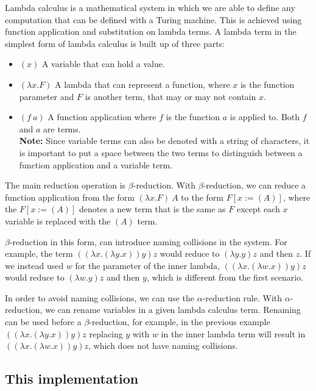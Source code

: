 \documentclass[12pt]{article}
\begin{document}
Lambda calculus is a mathematical system in which we are able to define any
computation that can be defined with a Turing machine. This is achieved using
function application and substitution on lambda terms. A lambda term in the
simplest form of lambda calculus is built up of three parts:
\begin{itemize}
    \item $(x)$ A variable that can hold a value.
    \item $(\lambda x. F)$ A lambda that can represent a function, where $x$
        is the function parameter and $F$ is another term, that may or 
        may not contain $x$.
    \item $(f\:a)$ A function application where $f$ is the function $a$ is
        applied to. Both $f$ and $a$ are terms. \\ \textbf{Note:} Since variable
        terms can also be denoted with a string of characters, it is important
        to put a space between the two terms to distinguish between a function
        application and a variable term.
\end{itemize}
The main reduction operation is $\beta$-reduction. With $\beta$-reduction, we
can reduce a function application from the form $(\lambda x. F)\:A$ to the
form $F[x := (A)]$, where the $F[x := (A)]$ denotes a new term that is the same
as $F$ except each $x$ variable is replaced with the $(A)$ term.

$\beta$-reduction in this form, can introduce naming collisions in the system.
For example, the term $((\lambda x. (\lambda y. x)) y) z$ would reduce to
$(\lambda y. y) z$ and then $z$. If we instead used $w$ for the parameter of the
inner lambda, $((\lambda x. (\lambda w. x)) y) z$ would reduce to $(\lambda w.
y) z$ and then $y$, which is different from the first scenario.

In order to avoid naming collisions, we can use the $\alpha$-reduction rule.
With $\alpha$-reduction, we can rename variables in a given lambda calculus
term. Renaming can be used before a $\beta$-reduction, for example, in the
previous example $((\lambda x. (\lambda y. x)) y) z$ replacing $y$ with $w$ in
the inner lambda term will result in $((\lambda x. (\lambda w. x)) y) z$, which
does not have naming collisions.


\subsection{This implementation} %
\end{document}
